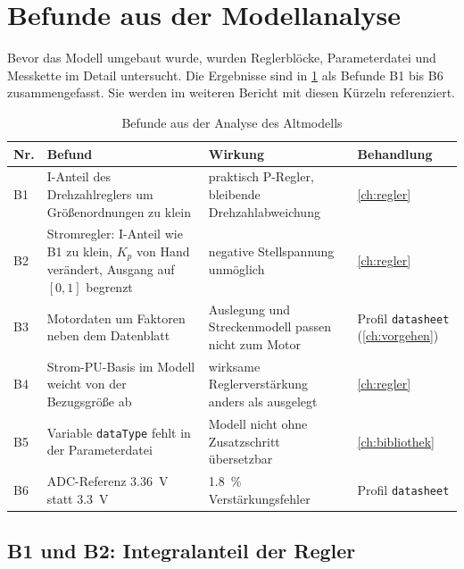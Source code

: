 \section{Befunde aus der Modellanalyse}
\label{sec:befunde}

Bevor das Modell umgebaut wurde, wurden Reglerblöcke, Parameterdatei und Messkette im
Detail untersucht. Die Ergebnisse sind in \cref{tab:befunde} als Befunde B1 bis B6
zusammengefasst. Sie werden im weiteren Bericht mit diesen Kürzeln referenziert.

\begin{table}[htbp]
  \centering
  \caption{Befunde aus der Analyse des Altmodells}
  \label{tab:befunde}
  \small
  \renewcommand{\arraystretch}{1.15}
  \begin{tabularx}{\linewidth}{@{}l>{\raggedright\arraybackslash}X
      >{\raggedright\arraybackslash}X >{\raggedright\arraybackslash}p{27mm}@{}}
    \toprule
    Nr. & Befund & Wirkung & Behandlung \\
    \midrule
    B1 & I-Anteil des Drehzahlreglers um Größenordnungen zu klein
       & praktisch P-Regler, bleibende Drehzahlabweichung
       & \cref{ch:regler} \\
    B2 & Stromregler: I-Anteil wie B1 zu klein, $K_p$ von Hand verändert,
         Ausgang auf $[0, 1]$ begrenzt
       & negative Stellspannung unmöglich
       & \cref{ch:regler} \\
    B3 & Motordaten um Faktoren neben dem Datenblatt
       & Auslegung und Streckenmodell passen nicht zum Motor
       & Profil \texttt{datasheet} (\cref{ch:vorgehen}) \\
    B4 & Strom-PU-Basis im Modell weicht von der Bezugsgröße ab
       & wirksame Reglerverstärkung anders als ausgelegt
       & \cref{ch:regler} \\
    B5 & Variable \texttt{dataType} fehlt in der Parameterdatei
       & Modell nicht ohne Zusatzschritt übersetzbar
       & \cref{ch:bibliothek} \\
    B6 & ADC-Referenz \SI{3,36}{\volt} statt \SI{3,3}{\volt}
       & \SI{1,8}{\percent} Verstärkungsfehler
       & Profil \texttt{datasheet} \\
    \bottomrule
  \end{tabularx}
\end{table}

\subsection*{B1 und B2: Integralanteil der Regler}

